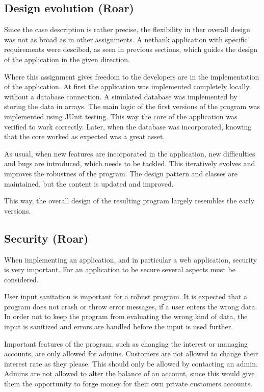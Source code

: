 
\subsection{Design evolution (Roar)}

Since the case description is rather precise, the flexibility in ther overall design was not as broad as in other assignments. A netbank application with specific requirements were descibed, as seen in previous sections, which guides the design of the application in the given direction. 

Where this assignment gives freedom to the developers are in the implementation of the application. At first the application was implemented completely locally without a database connection. A simulated database was implemented by storing the data in arrays. The main logic of the first versions of the program was implemented using JUnit testing. This way the core of the application was verified to work correctly. Later, when the database was incorporated, knowing that the core worked as expected was a great asset. 

As usual, when new features are incorporated in the application, new difficulties and bugs are introduced, which needs to be tackled. This iteratively evolves and improves the robustnes of the program. The design pattern and classes are maintained, but the content is updated and improved.

This way, the overall design of the resulting program largely resembles the early versions. 


\subsection{Security (Roar)}

When implementing an application, and in particular a web application, security is very important. For an application to be secure several aspects must be considered. 

User input sanitation is important for a robust program. It is expected that a program does not crash or throw error messages, if a user enters the wrong data. In order not to keep the program from evaluating the wrong kind of data, the input is sanitized and errors are handled before the input is used further.

Important features of the program, such as changing the interest or managing accounts, are only allowed for admins. Customers are not allowed to change their interest rate as they please. This should only be allowed by contacting an admin. Admins are not allowed to alter the balance of an account, since this would give them the opportunity to forge money for their own private customers accounts. 

